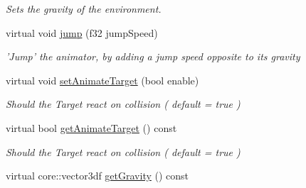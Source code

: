 \begin{DoxyCompactItemize}
\begin{DoxyCompactList}\small\item\em Sets the gravity of the environment. \end{DoxyCompactList}\item 
\hypertarget{classirr_1_1scene_1_1_c_scene_node_animator_collision_response_a3f77f8e65327173bce079d3a1e668430}{virtual void \hyperlink{classirr_1_1scene_1_1_c_scene_node_animator_collision_response_a3f77f8e65327173bce079d3a1e668430}{jump} (f32 jump\-Speed)}\label{classirr_1_1scene_1_1_c_scene_node_animator_collision_response_a3f77f8e65327173bce079d3a1e668430}

\begin{DoxyCompactList}\small\item\em 'Jump' the animator, by adding a jump speed opposite to its gravity \end{DoxyCompactList}\item 
\hypertarget{classirr_1_1scene_1_1_c_scene_node_animator_collision_response_ab05be9b5561e2e5d2b1ab7ad290c4a95}{virtual void \hyperlink{classirr_1_1scene_1_1_c_scene_node_animator_collision_response_ab05be9b5561e2e5d2b1ab7ad290c4a95}{set\-Animate\-Target} (bool enable)}\label{classirr_1_1scene_1_1_c_scene_node_animator_collision_response_ab05be9b5561e2e5d2b1ab7ad290c4a95}

\begin{DoxyCompactList}\small\item\em Should the Target react on collision ( default = true ) \end{DoxyCompactList}\item 
\hypertarget{classirr_1_1scene_1_1_c_scene_node_animator_collision_response_a6ea83e7aedd4ab8041dd04338464e79d}{virtual bool \hyperlink{classirr_1_1scene_1_1_c_scene_node_animator_collision_response_a6ea83e7aedd4ab8041dd04338464e79d}{get\-Animate\-Target} () const }\label{classirr_1_1scene_1_1_c_scene_node_animator_collision_response_a6ea83e7aedd4ab8041dd04338464e79d}

\begin{DoxyCompactList}\small\item\em Should the Target react on collision ( default = true ) \end{DoxyCompactList}\item 
\hypertarget{classirr_1_1scene_1_1_c_scene_node_animator_collision_response_aa5c3f45b45a4e4e61a1c4c004933927b}{virtual core\-::vector3df \hyperlink{classirr_1_1scene_1_1_c_scene_node_animator_collision_response_aa5c3f45b45a4e4e61a1c4c004933927b}{get\-Gravity} () const }\label{classirr_1_1scene_1_1_c_scene_node_animator_collision_response_aa5c3f45b45a4e4e61a1c4c004933927b}


\end{DoxyCompactItemize}
